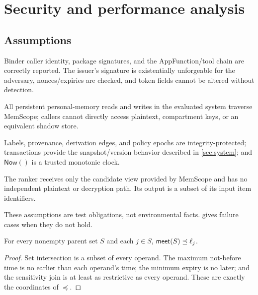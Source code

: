 \section{Security and performance analysis}
\label{sec:theory}

\subsection{Assumptions}

\begin{assumption}
Binder caller identity, package signatures, and the AppFunction/tool chain are correctly reported. The issuer's signature is existentially unforgeable for the adversary, nonces/expiries are checked, and token fields cannot be altered without detection.
\label{ass:token}
\end{assumption}

\begin{assumption}
All persistent personal-memory reads and writes in the evaluated system traverse MemScope; callers cannot directly access plaintext, compartment keys, or an equivalent shadow store.
\label{ass:mediation}
\end{assumption}

\begin{assumption}
Labels, provenance, derivation edges, and policy epochs are integrity-protected; transactions provide the snapshot/version behavior described in \cref{sec:system}; and $\mathsf{Now}()$ is a trusted monotonic clock.
\label{ass:state}
\end{assumption}

\begin{assumption}
The ranker receives only the candidate view provided by MemScope and has no independent plaintext or decryption path. Its output is a subset of its input item identifiers.
\label{ass:ranker}
\end{assumption}

These assumptions are test obligations, not environmental facts.  gives failure cases when they do not hold.

\begin{lemma}
\label{lem:meet}
For every nonempty parent set $S$ and each $j\in S$, $\mathsf{meet}(S)\preceq\ell_j$.
\end{lemma}
\begin{proof}
Set intersection is a subset of every operand. The maximum not-before time is no earlier than each operand's time; the minimum expiry is no later; and the sensitivity join is at least as restrictive as every operand. These are exactly the coordinates of $\preceq$.
\end{proof}

